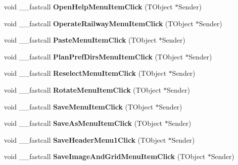 \begin{DoxyCompactItemize}
void \+\_\+\+\_\+fastcall {\bfseries Open\+Help\+Menu\+Item\+Click} (T\+Object $\ast$Sender)
\item 
\mbox{\label{class_t_interface_a472d8ac93d85b4d5605d5bbe39179d5a}} 
void \+\_\+\+\_\+fastcall {\bfseries Operate\+Railway\+Menu\+Item\+Click} (T\+Object $\ast$Sender)
\item 
\mbox{\label{class_t_interface_a4ef96184d97d0f9ff92e78328578e825}} 
void \+\_\+\+\_\+fastcall {\bfseries Paste\+Menu\+Item\+Click} (T\+Object $\ast$Sender)
\item 
\mbox{\label{class_t_interface_a0cd00a2df93531ea1534d280e00e85e0}} 
void \+\_\+\+\_\+fastcall {\bfseries Plan\+Pref\+Dirs\+Menu\+Item\+Click} (T\+Object $\ast$Sender)
\item 
\mbox{\label{class_t_interface_a7d0d3bbfab692ca3d26c1eea6ef24542}} 
void \+\_\+\+\_\+fastcall {\bfseries Reselect\+Menu\+Item\+Click} (T\+Object $\ast$Sender)
\item 
\mbox{\label{class_t_interface_a02e91aba36e2b91354abd2884f658510}} 
void \+\_\+\+\_\+fastcall {\bfseries Rotate\+Menu\+Item\+Click} (T\+Object $\ast$Sender)
\item 
\mbox{\label{class_t_interface_a7699c9c408064623d335d3452b60f289}} 
void \+\_\+\+\_\+fastcall {\bfseries Save\+Menu\+Item\+Click} (T\+Object $\ast$Sender)
\item 
\mbox{\label{class_t_interface_a0be281457630fce07fc19cdbbfde79b1}} 
void \+\_\+\+\_\+fastcall {\bfseries Save\+As\+Menu\+Item\+Click} (T\+Object $\ast$Sender)
\item 
\mbox{\label{class_t_interface_a4f373f26e99a3dc0bc7effc71ca25dc0}} 
void \+\_\+\+\_\+fastcall {\bfseries Save\+Header\+Menu1\+Click} (T\+Object $\ast$Sender)
\item 
\mbox{\label{class_t_interface_a14d8976ee13c85f12eab634de845baf1}} 
void \+\_\+\+\_\+fastcall {\bfseries Save\+Image\+And\+Grid\+Menu\+Item\+Click} (T\+Object $\ast$Sender)
\item 
\mbox{\label{class_t_interface_ab73377784e302350bcc4f1fed4f8d90a}} 

\end{DoxyCompactItemize}
